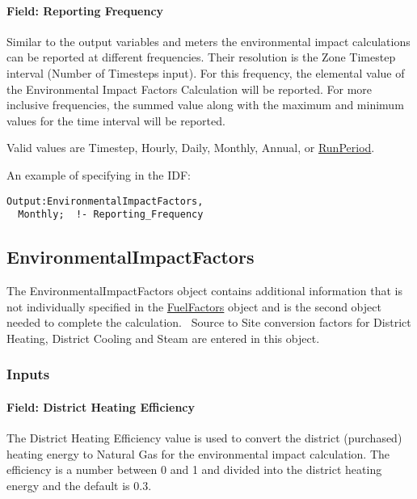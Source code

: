 \paragraph{Field: Reporting Frequency}\label{field-reporting-frequency-2}

Similar to the output variables and meters the environmental impact calculations can be reported at different frequencies. Their resolution is the Zone Timestep interval (Number of Timesteps input). For this frequency, the elemental value of the Environmental Impact Factors Calculation will be reported. For more inclusive frequencies, the summed value along with the maximum and minimum values for the time interval will be reported.

Valid values are Timestep, Hourly, Daily, Monthly, Annual, or \hyperref[runperiod]{RunPeriod}.

An example of specifying in the IDF:

\begin{lstlisting}
Output:EnvironmentalImpactFactors,
  Monthly;  !- Reporting_Frequency
\end{lstlisting}

\subsection{EnvironmentalImpactFactors}\label{environmentalimpactfactors}

The EnvironmentalImpactFactors object contains additional information that is not individually specified in the \hyperref[fuelfactors]{FuelFactors} object and is the second object needed to complete the calculation.~ Source to Site conversion factors for District Heating, District Cooling and Steam are entered in this object.

\subsubsection{Inputs}\label{inputs-10-017}

\paragraph{Field: District Heating Efficiency}\label{field-district-heating-efficiency}

The District Heating Efficiency value is used to convert the district (purchased) heating energy to Natural Gas for the environmental impact calculation. The efficiency is a number between 0 and 1 and divided into the district heating energy and the default is 0.3.

